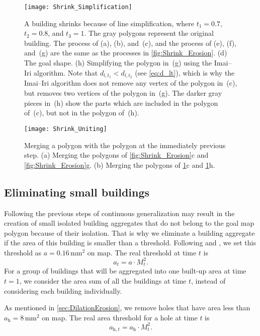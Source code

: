 \begin{figure}[tb]
	\centering
	\texttt{[image: Shrink\_Simplification]}
	\caption{A building shrinks because of line simplification, 
		where $t_1=0.7$, $t_2=0.8$, and $t_3=1$.
		The gray polygons represent the original building.
		The process of (a), (b), and~(c), and 
		the process of (e), (f), and~(g) are the same as 
		the processes in \fig\ref{fig:Shrink_Erosion}.
		(d) The goal shape.
		(h) Simplifying the polygon in~(g) using the Imai--Iri algorithm.
		Note that $d_{l,t_1}<d_{l,t_2}$ (see \eq\ref{eq:d_lt}),
		which is why the Imai--Iri algorithm does not 
		remove any vertex of the polygon in~(c),
		but removes two vertices of the polygon in~(g).
		The darker gray pieces in~(h) show 
		the parts which are included in the polygon of~(c), 
		but not in the polygon of~(h).
	}
	\label{fig:Shrink_Simplification}
\end{figure}

\begin{figure}[tb]
	\centering
	\texttt{[image: Shrink\_Uniting]}
	\caption{Merging a polygon with the polygon at the immediately previous 
		step.
		(a) Merging the polygons of \fig\ref{fig:Shrink_Erosion}c and 
		\fig\ref{fig:Shrink_Erosion}g.
		(b) Merging the polygons of \fig\ref{fig:Shrink_Simplification}c and 
		\fig\ref{fig:Shrink_Simplification}h.
	}
	\label{fig:Shrink_Uniting}
\end{figure}




\subsection{Eliminating small buildings}
\label{sec:Eliminate}
Following the previous steps of continuous generalization may result in the 
creation of small isolated building aggregates that do not belong to the goal 
map polygon because of their isolation.
That is why we eliminate a building aggregate if the area of this building is 
smaller than a threshold.
Following \citet{Stoter2009} and \citet{Chaudhry2008}, 
we set this threshold as $a=0.16\,\mathrm{mm}^2$ on map.
The real threshold at time $t$ is
\[
a_t=a\cdot M_t^2.
\]
For a group of buildings that will be aggregated into one built-up area at time 
$t=1$, we consider the area sum of all the buildings at time $t$, 
instead of considering each building individually.

As mentioned in \sect\ref{sec:DilationErosion}, 
we remove holes that have area less than 
$a_\mathrm{h} = 8\,\mathrm{mm}^2$ on map.
The real area threshold for a hole at time $t$ is
\[
a_{\mathrm{h},t}=a_\mathrm{h}\cdot M_t^2.
\]

